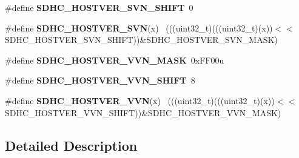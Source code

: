 \begin{DoxyCompactItemize}
\item 
\hypertarget{group___s_d_h_c___register___masks_gab6a2f24b88cbb5db5621995be9e56bcd}{}\#define {\bfseries S\+D\+H\+C\+\_\+\+H\+O\+S\+T\+V\+E\+R\+\_\+\+S\+V\+N\+\_\+\+S\+H\+I\+F\+T}~0\label{group___s_d_h_c___register___masks_gab6a2f24b88cbb5db5621995be9e56bcd}

\item 
\hypertarget{group___s_d_h_c___register___masks_ga57b64b09fb02809a0b78f0211984d16c}{}\#define {\bfseries S\+D\+H\+C\+\_\+\+H\+O\+S\+T\+V\+E\+R\+\_\+\+S\+V\+N}(x)                                        ~(((uint32\+\_\+t)(((uint32\+\_\+t)(x))$<$$<$S\+D\+H\+C\+\_\+\+H\+O\+S\+T\+V\+E\+R\+\_\+\+S\+V\+N\+\_\+\+S\+H\+I\+F\+T))\&S\+D\+H\+C\+\_\+\+H\+O\+S\+T\+V\+E\+R\+\_\+\+S\+V\+N\+\_\+\+M\+A\+S\+K)\label{group___s_d_h_c___register___masks_ga57b64b09fb02809a0b78f0211984d16c}

\item 
\hypertarget{group___s_d_h_c___register___masks_ga8fd5f14b61267f8ef598236b95cb3b7d}{}\#define {\bfseries S\+D\+H\+C\+\_\+\+H\+O\+S\+T\+V\+E\+R\+\_\+\+V\+V\+N\+\_\+\+M\+A\+S\+K}~0x\+F\+F00u\label{group___s_d_h_c___register___masks_ga8fd5f14b61267f8ef598236b95cb3b7d}

\item 
\hypertarget{group___s_d_h_c___register___masks_ga706bd372f8258fdf62c2e50ff2c5ee99}{}\#define {\bfseries S\+D\+H\+C\+\_\+\+H\+O\+S\+T\+V\+E\+R\+\_\+\+V\+V\+N\+\_\+\+S\+H\+I\+F\+T}~8\label{group___s_d_h_c___register___masks_ga706bd372f8258fdf62c2e50ff2c5ee99}

\item 
\hypertarget{group___s_d_h_c___register___masks_ga5f966bc34f2877f5996d4092166ca889}{}\#define {\bfseries S\+D\+H\+C\+\_\+\+H\+O\+S\+T\+V\+E\+R\+\_\+\+V\+V\+N}(x)                                        ~(((uint32\+\_\+t)(((uint32\+\_\+t)(x))$<$$<$S\+D\+H\+C\+\_\+\+H\+O\+S\+T\+V\+E\+R\+\_\+\+V\+V\+N\+\_\+\+S\+H\+I\+F\+T))\&S\+D\+H\+C\+\_\+\+H\+O\+S\+T\+V\+E\+R\+\_\+\+V\+V\+N\+\_\+\+M\+A\+S\+K)\label{group___s_d_h_c___register___masks_ga5f966bc34f2877f5996d4092166ca889}

\end{DoxyCompactItemize}


\subsection{Detailed Description}
